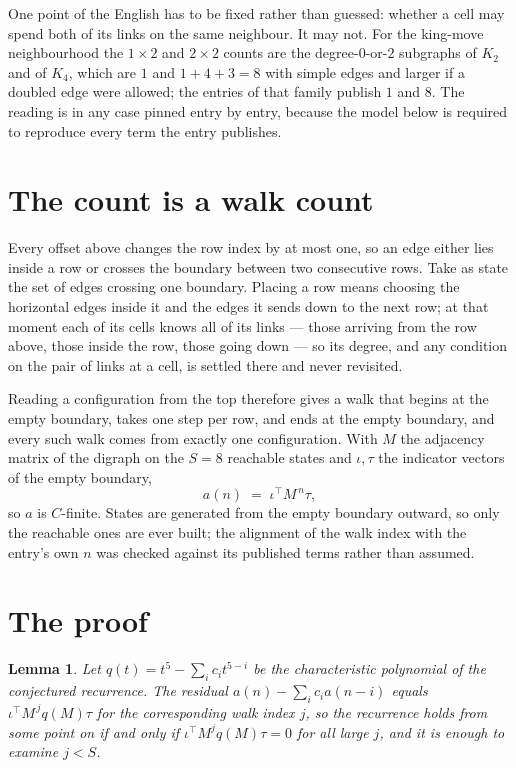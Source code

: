 \documentclass[11pt,a4paper]{article}
\theoremstyle{plain}
\newtheorem{lemma}[theorem]{Lemma}
\theoremstyle{definition}
\begin{document}
One point of the English has to be fixed rather than guessed: whether a cell may spend both of
its links on the same neighbour. It may not. For the king-move neighbourhood the $1\times2$
and $2\times2$ counts are the degree-$0$-or-$2$ subgraphs of $K_2$ and of $K_4$, which are $1$
and $1+4+3=8$ with simple edges and larger if a doubled edge were allowed; the entries of that
family publish $1$ and $8$. The reading is in any case pinned entry by entry, because the
model below is required to reproduce every term the entry publishes.


\section{The count is a walk count}

Every offset above changes the row index by at most one, so an edge either lies inside a row
or crosses the boundary between two consecutive rows. Take as state the set of edges crossing
one boundary. Placing a row means choosing the horizontal edges inside it and the edges it
sends down to the next row; at that moment each of its cells knows all of its links --- those
arriving from the row above, those inside the row, those going down --- so its degree, and any
condition on the pair of links at a cell, is settled there and never revisited.

Reading a configuration from the top therefore gives a walk that begins at the empty boundary,
takes one step per row, and ends at the empty boundary, and every such walk comes from exactly
one configuration. With $M$ the adjacency matrix of the digraph on the $S=8$ reachable
states and $\iota,\tau$ the indicator vectors of the empty boundary,
\[
a(n)\;=\;\iota^{\!\top}M^{\,n}\tau ,
\]
so $a$ is $C$-finite. States are generated from the empty boundary outward, so only the
reachable ones are ever built; the alignment of the walk index with the entry's own $n$ was
checked against its published terms rather than assumed.

\section{The proof}

\begin{lemma}\label{lem:crit}
Let $q(t)=t^{5}-\sum_i c_it^{5-i}$ be the characteristic polynomial of the
conjectured recurrence. The residual $a(n)-\sum_ic_ia(n-i)$ equals
$\iota^{\!\top}M^{\,j}q(M)\tau$ for the corresponding walk index $j$, so the recurrence
holds from some point on if and only if $\iota^{\!\top}M^{j}q(M)\tau=0$ for all large $j$,
and it is enough to examine $j<S$.
\end{lemma}
\end{document}
